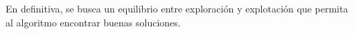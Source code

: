 En definitiva, se busca un equilibrio entre exploración y explotación que permita al algoritmo encontrar buenas soluciones.










